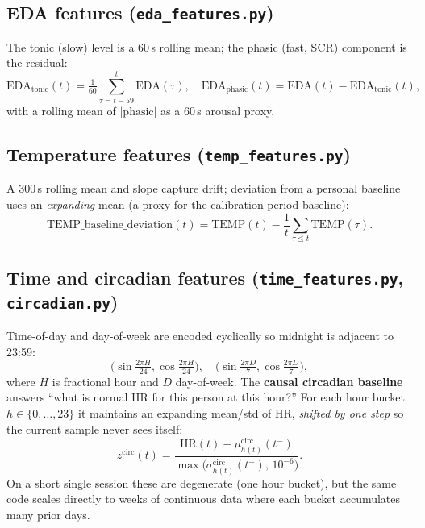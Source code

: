 \documentclass[11pt,a4paper]{article}
\begin{document}
\subsection{EDA features (\texttt{eda\_features.py})}
The tonic (slow) level is a 60\,s rolling mean; the phasic (fast, SCR) component
is the residual:
\[
\text{EDA}_{\text{tonic}}(t)=\tfrac{1}{60}\!\!\sum_{\tau=t-59}^{t}\!\!\text{EDA}(\tau),
\quad
\text{EDA}_{\text{phasic}}(t)=\text{EDA}(t)-\text{EDA}_{\text{tonic}}(t),
\]
with a rolling mean of $\lvert\text{phasic}\rvert$ as a 60\,s arousal proxy.

\subsection{Temperature features (\texttt{temp\_features.py})}
A 300\,s rolling mean and slope capture drift; deviation from a personal baseline
uses an \emph{expanding} mean (a proxy for the calibration-period baseline):
\[
\text{TEMP\_baseline\_deviation}(t)=\text{TEMP}(t)-\frac{1}{t}\sum_{\tau\le t}\text{TEMP}(\tau).
\]

\subsection{Time and circadian features (\texttt{time\_features.py}, \texttt{circadian.py})}
Time-of-day and day-of-week are encoded cyclically so midnight is adjacent to
23:59:
\[
\Big(\sin\tfrac{2\pi H}{24},\cos\tfrac{2\pi H}{24}\Big),\quad
\Big(\sin\tfrac{2\pi D}{7},\cos\tfrac{2\pi D}{7}\Big),
\]
where $H$ is fractional hour and $D$ day-of-week. The \textbf{causal circadian
baseline} answers ``what is normal HR for this person at this hour?'' For each
hour bucket $h\in\{0,\dots,23\}$ it maintains an expanding mean/std of HR,
\emph{shifted by one step} so the current sample never sees itself:
\[
z^{\text{circ}}(t)=\frac{\text{HR}(t)-\mu^{\text{circ}}_{h(t)}(t^-)}
{\max\!\big(\sigma^{\text{circ}}_{h(t)}(t^-),\,10^{-6}\big)}.
\]
On a short single session these are degenerate (one hour bucket), but the same
code scales directly to weeks of continuous data where each bucket accumulates
many prior days.
\end{document}
